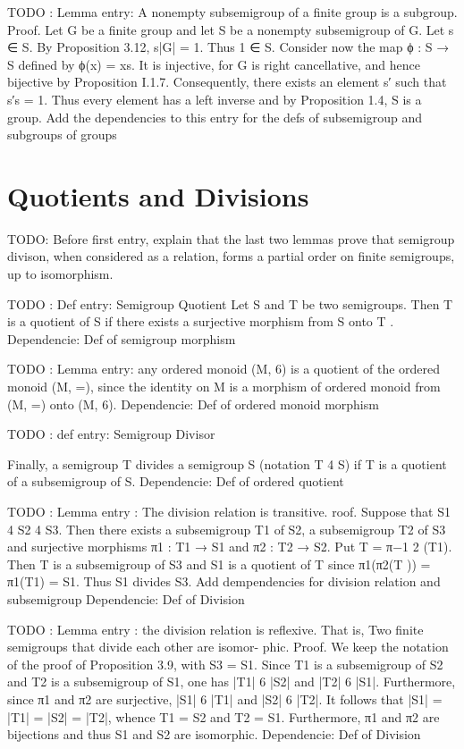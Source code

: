 TODO : Lemma entry: 
 A nonempty subsemigroup of a finite group is a subgroup.
Proof. Let G be a finite group and let S be a nonempty subsemigroup of G.
Let s ∈ S. By Proposition 3.12, s|G| = 1. Thus 1 ∈ S. Consider now the map
ϕ : S → S defined by ϕ(x) = xs. It is injective, for G is right cancellative, and
hence bijective by Proposition I.1.7. Consequently, there exists an element s′
such that s′s = 1. Thus every element has a left inverse and by Proposition 1.4,
S is a group.
Add the dependencies to this entry for the defs of subsemigroup and subgroups of groups

\section {Quotients and Divisions}

TODO: Before first entry, explain that the last two lemmas
prove that semigroup divison, when considered as a relation, forms 
a partial order on finite semigroups, up to isomorphism.

TODO : Def entry: Semigroup Quotient
Let S and T be two semigroups. Then T is
a quotient of S if there exists a surjective morphism from S onto T .
Dependencie: Def of semigroup morphism

TODO : Lemma entry: 
 any ordered monoid (M, 6) is a quotient of the ordered monoid
(M, =), since the identity on M is a morphism of ordered monoid from (M, =)
onto (M, 6).
Dependencie: Def of ordered monoid morphism

TODO : def entry: Semigroup Divisor

Finally, a semigroup T divides a semigroup S (notation T 4 S) if T is a
quotient of a subsemigroup of S.
Dependencie: Def of ordered quotient


TODO : Lemma entry : 
The division relation is transitive.
roof. Suppose that S1 4 S2 4 S3. Then there exists a subsemigroup T1
of S2, a subsemigroup T2 of S3 and surjective morphisms π1 : T1 → S1 and
π2 : T2 → S2. Put T = π−1
2 (T1). Then T is a subsemigroup of S3 and S1 is a
quotient of T since π1(π2(T )) = π1(T1) = S1. Thus S1 divides S3.
Add dempendencies for division relation and subsemigroup
Dependencie: Def of Division

TODO : Lemma entry :
the division relation is reflexive. That is, 
Two finite semigroups that divide each other are isomor-
phic.
Proof. We keep the notation of the proof of Proposition 3.9, with S3 = S1.
Since T1 is a subsemigroup of S2 and T2 is a subsemigroup of S1, one has |T1| 6
|S2| and |T2| 6 |S1|. Furthermore, since π1 and π2 are surjective, |S1| 6 |T1|
and |S2| 6 |T2|. It follows that |S1| = |T1| = |S2| = |T2|, whence T1 = S2
and T2 = S1. Furthermore, π1 and π2 are bijections and thus S1 and S2 are
isomorphic.
Dependencie: Def of Division

